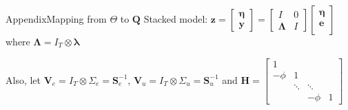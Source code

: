 \documentclass[xcolor=svgnames, 10pt, aspectratio=169]{beamer}
\begin{document}
\begin{frame}{Appendix}{Mapping from $\Theta$ to $\mathbf{Q}$}
\label{app_mapping}
Stacked model: $
    \mathbf{z}
    = 
    \begin{bmatrix}
        \boldsymbol{\eta} \\
        \mathbf{y}
    \end{bmatrix} 
    = 
    \begin{bmatrix}
        I & 0 \\
        \boldsymbol{\Lambda} & I 
    \end{bmatrix}
    \begin{bmatrix}
        \boldsymbol{\eta} \\
        \mathbf{e}\\
    \end{bmatrix}
$ where $\boldsymbol{\Lambda} = I_T \otimes \boldsymbol{\lambda}$

Also, let $\mathbf{V}_{\!e} = I_T \otimes \Sigma_e = \mathbf{S}_{e}^{-1}$, $\mathbf{V}_{\!u} = I_T \otimes \Sigma_u = \mathbf{S}_{u}^{-1}$ and $
\mathbf{H} = \begin{bmatrix}
        1 &  &  &   \\
        -\phi & 1 &  &  \\
         & \ddots & \ddots &  \\
         &  & -\phi & 1
    \end{bmatrix}
$


\end{frame}
\end{document}
